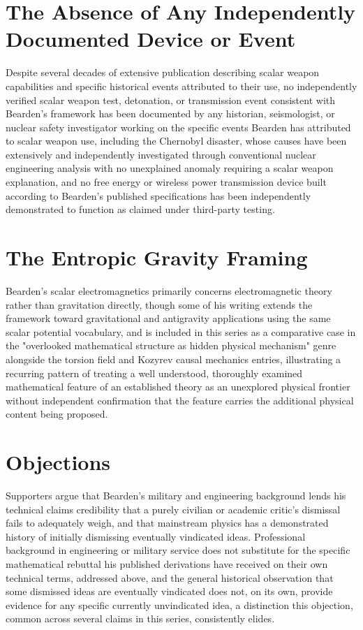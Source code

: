 \documentclass[11pt]{article}
\begin{document}
\section{The Absence of Any Independently Documented Device or Event}

Despite several decades of extensive publication describing scalar weapon capabilities and specific historical events attributed to their use, no independently verified scalar weapon test, detonation, or transmission event consistent with Bearden's framework has been documented by any historian, seismologist, or nuclear safety investigator working on the specific events Bearden has attributed to scalar weapon use, including the Chernobyl disaster, whose causes have been extensively and independently investigated through conventional nuclear engineering analysis with no unexplained anomaly requiring a scalar weapon explanation, and no free energy or wireless power transmission device built according to Bearden's published specifications has been independently demonstrated to function as claimed under third-party testing.

\section{The Entropic Gravity Framing}

Bearden's scalar electromagnetics primarily concerns electromagnetic theory rather than gravitation directly, though some of his writing extends the framework toward gravitational and antigravity applications using the same scalar potential vocabulary, and is included in this series as a comparative case in the "overlooked mathematical structure as hidden physical mechanism" genre alongside the torsion field and Kozyrev causal mechanics entries, illustrating a recurring pattern of treating a well understood, thoroughly examined mathematical feature of an established theory as an unexplored physical frontier without independent confirmation that the feature carries the additional physical content being proposed.

\section{Objections}

Supporters argue that Bearden's military and engineering background lends his technical claims credibility that a purely civilian or academic critic's dismissal fails to adequately weigh, and that mainstream physics has a demonstrated history of initially dismissing eventually vindicated ideas. Professional background in engineering or military service does not substitute for the specific mathematical rebuttal his published derivations have received on their own technical terms, addressed above, and the general historical observation that some dismissed ideas are eventually vindicated does not, on its own, provide evidence for any specific currently unvindicated idea, a distinction this objection, common across several claims in this series, consistently elides.
\end{document}
